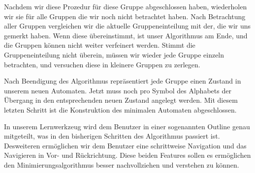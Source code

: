 Nachdem wir diese Prozedur für diese Gruppe
abgeschlossen haben, wiederholen wir sie für alle Gruppen die wir noch nicht
betrachtet haben. Nach Betrachtung aller Gruppen vergleichen wir die aktuelle
Gruppeneinteilung mit der, die wir uns gemerkt haben. Wenn diese übereinstimmt,
ist unser Algorithmus am Ende, und die Gruppen können nicht weiter verfeinert
werden. Stimmt die Gruppeneinteilung nicht überein, müssen wir wieder jede
Gruppe einzeln betrachten, und versuchen diese in kleinere Gruppen zu
zerlegen.\vspace{10pt}

Nach Beendigung des Algorithmus repräsentiert jede Gruppe einen Zustand
in unserem neuen Automaten. Jetzt muss noch pro Symbol des Alphabets der
Übergang in den entsprechenden neuen Zustand angelegt werden. Mit diesem
letzten Schritt ist die Konstruktion des minimalen Automaten
abgeschlossen.\vspace{10pt}

In unserem Lernwerkzeug wird dem Benutzer in einer sogenannten Outline genau
mitgeteilt, was in den bisherigen Schritten des Algorithmus passiert ist.
Desweiteren ermöglichen wir dem Benutzer eine schrittweise Navigation und das
Navigieren in Vor- und Rückrichtung. Diese beiden Features sollen es ermöglichen
den Minimierungsalgorithmus besser nachvollziehen und verstehen zu
können.\vspace{10pt}
